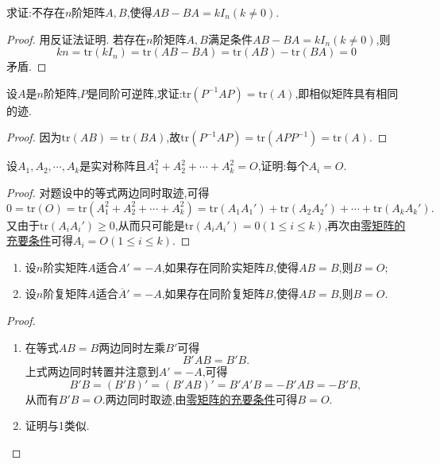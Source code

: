 \documentclass[../../main.tex]{subfiles}
\begin{document}
\begin{example}
求证:不存在\(n\)阶矩阵\(A,B\),使得\(AB - BA = kI_n(k\neq0)\).
\end{example}
\begin{proof}
用反证法证明. 若存在\(n\)阶矩阵\(A,B\)满足条件\(AB - BA = kI_n(k\neq0)\),则
\[
kn=\mathrm{tr}(kI_n)=\mathrm{tr}(AB - BA)=\mathrm{tr}(AB)-\mathrm{tr}(BA)=0
\]
矛盾.
\end{proof}

\begin{proposition}
设\(A\)是\(n\)阶矩阵,\(P\)是同阶可逆阵,求证:\(\mathrm{tr}(P^{-1}AP)=\mathrm{tr}(A)\),即相似矩阵具有相同的迹.
\end{proposition}
\begin{proof}
因为\(\mathrm{tr}(AB)=\mathrm{tr}(BA)\),故\(\mathrm{tr}(P^{-1}AP)=\mathrm{tr}(APP^{-1})=\mathrm{tr}(A)\).
\end{proof}

\begin{example}
设\(A_1,A_2,\cdots,A_k\)是实对称阵且\(A_1^2 + A_2^2+\cdots+A_k^2 = O\),证明:每个\(A_i = O\).
\end{example}
\begin{proof}
对题设中的等式两边同时取迹,可得
\[
0=\mathrm{tr}(O)=\mathrm{tr}(A_1^2 + A_2^2+\cdots+A_k^2)=\mathrm{tr}(A_1A_1')+\mathrm{tr}(A_2A_2')+\cdots+\mathrm{tr}(A_kA_k').
\]
又由于\(\mathrm{tr}(A_iA_i')\geq0\),从而只可能是\(\mathrm{tr}(A_iA_i') = 0(1\leq i\leq k)\),再次由\hyperref[proposition:零矩阵的充要条件]{零矩阵的充要条件}可得\(A_i = O(1\leq i\leq k)\).
\end{proof}

\begin{proposition}\label{proposition:反称/反酉矩阵为零矩阵的充要条件}
\begin{enumerate}
\item 设\(n\)阶实矩阵\(A\)适合\(A'=-A\),如果存在同阶实矩阵\(B\),使得\(AB = B\),则\(B = O\);
\item 设\(n\)阶复矩阵\(A\)适合\(\overline{A}'=-A\),如果存在同阶复矩阵\(B\),使得\(AB = B\),则\(B = O\).
\end{enumerate}
\end{proposition}
\begin{proof}
\begin{enumerate}
\item 在等式\(AB = B\)两边同时左乘\(B'\)可得
\[
B'AB = B'B.
\]
上式两边同时转置并注意到\(A'=-A\),可得
\[
B'B=(B'B)'=(B'AB)'=B'A'B=-B'AB=-B'B,
\]
从而有\(B'B = O\).两边同时取迹,由\hyperref[proposition:零矩阵的充要条件]{零矩阵的充要条件}可得\(B = O\).
\item 证明与1类似.
\end{enumerate}
\end{proof}
\end{document}

